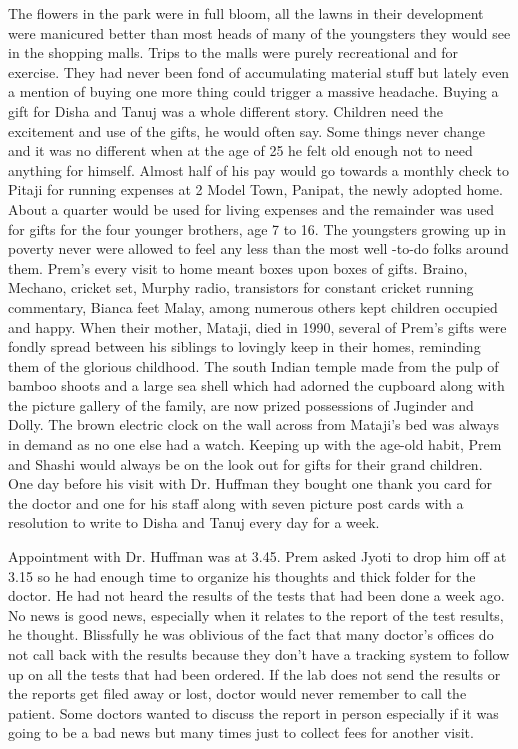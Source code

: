 The flowers in the park were in full bloom, all the lawns in their
development were manicured better than most heads of many of the
youngsters they would see in the shopping malls. Trips to the malls were
purely recreational and for exercise. They had never been fond of
accumulating material stuff but lately even a mention of buying one more
thing could trigger a massive headache. Buying a gift for Disha and
Tanuj was a whole different story. Children need the excitement and use
of the gifts, he would often say. Some things never change and it was no
different when at the age of 25 he felt old enough not to need anything
for himself. Almost half of his pay would go towards a monthly check to
Pitaji for running expenses at 2 Model Town, Panipat, the newly adopted
home. About a quarter would be used for living expenses and the
remainder was used for gifts for the four younger brothers, age 7 to 16.
The youngsters growing up in poverty never were allowed to feel any less
than the most well -to-do folks around them. Prem's every visit to home
meant boxes upon boxes of gifts. Braino, Mechano, cricket set, Murphy
radio, transistors for constant cricket running commentary, Bianca feet
Malay, among numerous others kept children occupied and happy. When
their mother, Mataji, died in 1990, several of Prem's gifts were fondly
spread between his siblings to lovingly keep in their homes, reminding
them of the glorious childhood. The south Indian temple made from the
pulp of bamboo shoots and a large sea shell which had adorned the
cupboard along with the picture gallery of the family, are now prized
possessions of Juginder and Dolly. The brown electric clock on the wall
across from Mataji's bed was always in demand as no one else had a
watch. Keeping up with the age-old habit, Prem and Shashi would always
be on the look out for gifts for their grand children. One day before
his visit with Dr. Huffman they bought one thank you card for the doctor
and one for his staff along with seven picture post cards with a
resolution to write to Disha and Tanuj every day for a week.

Appointment with Dr. Huffman was at 3.45. Prem asked Jyoti to drop him
off at 3.15 so he had enough time to organize his thoughts and thick
folder for the doctor. He had not heard the results of the tests that
had been done a week ago. No news is good news, especially when it
relates to the report of the test results, he thought. Blissfully he was
oblivious of the fact that many doctor's offices do not call back with
the results because they don't have a tracking system to follow up on
all the tests that had been ordered. If the lab does not send the
results or the reports get filed away or lost, doctor would never
remember to call the patient. Some doctors wanted to discuss the report
in person especially if it was going to be a bad news but many times
just to collect fees for another visit.

